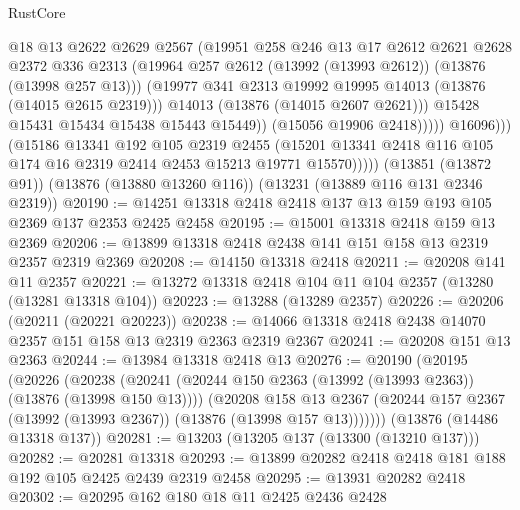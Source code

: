 \begin{lexlean}{RustCore}
\begin{coremodule}
                            @18
                            @13
                            @2622
                            @2629
                            @2567
                            (@19951
                              @258
                              @246
                              @13
                              @17
                              @2612
                              @2621
                              @2628
                              @2372
                              @336
                              @2313
                              (@19964 @257 @2612 (@13992 (@13993 @2612)) (@13876 (@13998 @257 @13)))
                              (@19977 @341 @2313 @19992 @19995 @14013 (@13876 (@14015 @2615 @2319)))
                              @14013
                              (@13876 (@14015 @2607 @2621)))
                            @15428
                            @15431
                            @15434
                            @15438
                            @15443
                            @15449))
                        (@15056 @19906 @2418)))))
                @16096)))
          (@15186
            @13341
            @192
            @105
            @2319
            @2455
            (@15201 @13341 @2418 @116 @105 @174 @16 @2319 @2414 @2453 @15213 @19771 @15570)))))
    (@13851 (@13872 @91))
    (@13876 (@13880 @13260 @116))
    (@13231 (@13889 @116 @131 @2346 @2319))
@20190 := @14251 @13318 @2418 @2418 @137 @13 @159 @193 @105 @2369 @137 @2353 @2425 @2458
@20195 := @15001 @13318 @2418 @159 @13 @2369
@20206 := @13899 @13318 @2418 @2438 @141 @151 @158 @13 @2319 @2357 @2319 @2369
@20208 := @14150 @13318 @2418
@20211 := @20208 @141 @11 @2357
@20221 := @13272 @13318 @2418 @104 @11 @104 @2357 (@13280 (@13281 @13318 @104))
@20223 := @13288 (@13289 @2357)
@20226 := @20206 (@20211 (@20221 @20223))
@20238 := @14066 @13318 @2418 @2438 @14070 @2357 @151 @158 @13 @2319 @2363 @2319 @2367
@20241 := @20208 @151 @13 @2363
@20244 := @13984 @13318 @2418 @13
@20276 := @20190
    (@20195
      (@20226
        (@20238
          (@20241 (@20244 @150 @2363 (@13992 (@13993 @2363)) (@13876 (@13998 @150 @13))))
          (@20208
            @158
            @13
            @2367
            (@20244 @157 @2367 (@13992 (@13993 @2367)) (@13876 (@13998 @157 @13)))))))
    (@13876 (@14486 @13318 @137))
@20281 := @13203 (@13205 @137 (@13300 (@13210 @137)))
@20282 := @20281 @13318
@20293 := @13899 @20282 @2418 @2418 @181 @188 @192 @105 @2425 @2439 @2319 @2458
@20295 := @13931 @20282 @2418
@20302 := @20295 @162 @180 @18 @11 @2425 @2436 @2428

\end{coremodule}
\end{lexlean}
